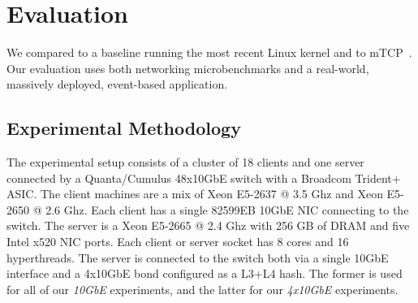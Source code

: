 
\section{Evaluation}
\label{sec:eval}


We compared \ix to a baseline running the most recent Linux kernel and to
mTCP~\cite{jeong2014mtcp}. Our evaluation uses both networking
microbenchmarks and a real-world, massively deployed, event-based
application.

\subsection{Experimental Methodology}
\label{sec:eval:setup}



 





The experimental setup consists of a cluster of 18 clients
and one server connected by
a Quanta/Cumulus 48x10GbE switch with a Broadcom Trident+ ASIC.
The client machines are a mix of Xeon E5-2637 @ 3.5 Ghz and Xeon
E5-2650 @ 2.6 Ghz.  Each client has a single 82599EB 10GbE NIC
connecting to the switch.  The server is a Xeon E5-2665 @ 2.4 Ghz with
256 GB of DRAM and five Intel x520 NIC ports.  Each client or server
socket has 8 cores and 16 hyperthreads.  The server is connected
to the switch both via a single 10GbE interface and a 4x10GbE bond configured as a L3+L4 hash.  The former is used for all of our \emph{10GbE} experiments, and the latter for our \emph{4x10GbE} experiments. 

